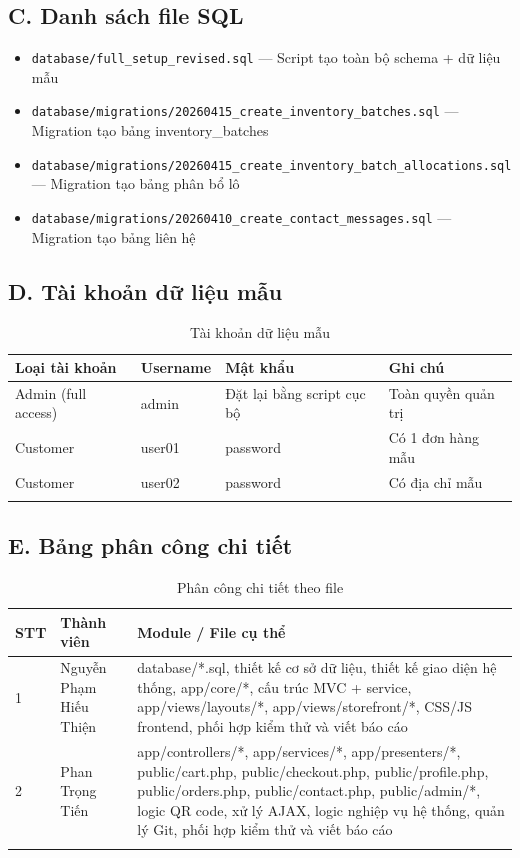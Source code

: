 \documentclass[a4paper]{article}
\begin{document}
\subsection*{C. Danh sách file SQL}

\begin{itemize}
    \item \texttt{database/full\_setup\_revised.sql} --- Script tạo toàn bộ schema + dữ liệu mẫu
    \item \texttt{database/migrations/20260415\_create\_inventory\_batches.sql} --- Migration tạo bảng inventory\_batches
    \item \texttt{database/migrations/20260415\_create\_inventory\_batch\_allocations.sql} --- Migration tạo bảng phân bổ lô
    \item \texttt{database/migrations/20260410\_create\_contact\_messages.sql} --- Migration tạo bảng liên hệ
\end{itemize}

\subsection*{D. Tài khoản dữ liệu mẫu}

\begin{longtable}{|p{3cm}|p{3cm}|p{3cm}|p{4cm}|}
\hline
\textbf{Loại tài khoản} & \textbf{Username} & \textbf{Mật khẩu} & \textbf{Ghi chú} \\
\hline
Admin (full access) & admin & Đặt lại bằng script cục bộ & Toàn quyền quản trị \\
\hline
Customer & user01 & password & Có 1 đơn hàng mẫu \\
\hline
Customer & user02 & password & Có địa chỉ mẫu \\
\hline
\caption{Tài khoản dữ liệu mẫu}
\end{longtable}

\subsection*{E. Bảng phân công chi tiết}

\begin{longtable}{|p{1cm}|p{3.5cm}|p{9cm}|}
\hline
\textbf{STT} & \textbf{Thành viên} & \textbf{Module / File cụ thể} \\
\hline
\endhead
1 & Nguyễn Phạm Hiếu Thiện & database/*.sql, thiết kế cơ sở dữ liệu, thiết kế giao diện hệ thống, app/core/*, cấu trúc MVC + service, app/views/layouts/*, app/views/storefront/*, CSS/JS frontend, phối hợp kiểm thử và viết báo cáo \\
\hline
2 & Phan Trọng Tiến & app/controllers/*, app/services/*, app/presenters/*, public/cart.php, public/checkout.php, public/profile.php, public/orders.php, public/contact.php, public/admin/*, logic QR code, xử lý AJAX, logic nghiệp vụ hệ thống, quản lý Git, phối hợp kiểm thử và viết báo cáo \\
\hline
\caption{Phân công chi tiết theo file}
\end{longtable}
\end{document}
